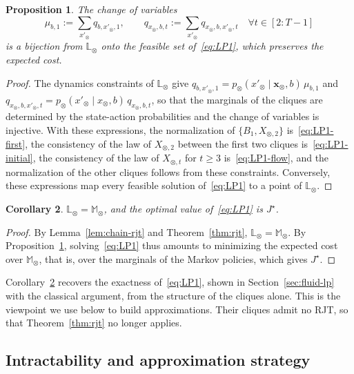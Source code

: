 \documentclass{article}
\newtheorem{proposition}{Proposition}
\newtheorem{corollary}[proposition]{Corollary}
\begin{document}
\begin{proposition}\label{prop:exact-marginal}
The change of variables
\[
  \mu_{b,1} := \sum_{x'_\otimes} q_{b,x'_\otimes,1}, \qquad
  q_{x_\otimes,b,t} := \sum_{x'_\otimes} q_{x_\otimes,b,x'_\otimes,t} \quad \forall t \in [2:T-1]
\]
is a bijection from $\mathbb{L}_\otimes$ onto the feasible set of~\eqref{eq:LP1}, which preserves the expected cost.
\end{proposition}
\begin{proof}
The dynamics constraints of $\mathbb{L}_\otimes$ give $q_{b,x'_\otimes,1} = p_\otimes(x'_\otimes \mid
\mathbf{x}_\otimes, b)\, \mu_{b,1}$ and $q_{x_\otimes,b,x'_\otimes,t} = p_\otimes(x'_\otimes \mid x_\otimes, b)\,
q_{x_\otimes,b,t}$, so that the marginals of the cliques are determined by the state-action probabilities and the
change of variables is injective. With these expressions, the normalization of $\{B_1, X_{\otimes,2}\}$
is~\eqref{eq:LP1-first}, the consistency of the law of $X_{\otimes,2}$ between the first two cliques
is~\eqref{eq:LP1-initial}, the consistency of the law of $X_{\otimes,t}$ for $t \ge 3$ is~\eqref{eq:LP1-flow}, and the
normalization of the other cliques follows from these constraints. Conversely, these expressions map every feasible
solution of~\eqref{eq:LP1} to a point of $\mathbb{L}_\otimes$.
\end{proof}

\begin{corollary}\label{cor:exact-lp}
$\mathbb{L}_\otimes = \mathbb{M}_\otimes$, and the optimal value of~\eqref{eq:LP1} is $J^\star$.
\end{corollary}
\begin{proof}
By Lemma~\ref{lem:chain-rjt} and Theorem~\ref{thm:rjt}, $\mathbb{L}_\otimes = \mathbb{M}_\otimes$. By
Proposition~\ref{prop:exact-marginal}, solving~\eqref{eq:LP1} thus amounts to minimizing the expected cost over
$\mathbb{M}_\otimes$, that is, over the marginals of the Markov policies, which gives $J^\star$.
\end{proof}
Corollary~\ref{cor:exact-lp} recovers the exactness of~\eqref{eq:LP1}, shown in Section~\ref{sec:fluid-lp} with the
classical argument, from the structure of the cliques alone. This is the viewpoint we use below to build
approximations. Their cliques admit no RJT, so that Theorem~\ref{thm:rjt} no longer applies.

\subsection{Intractability and approximation strategy}
\label{sec:approx-strategy}
\end{document}
